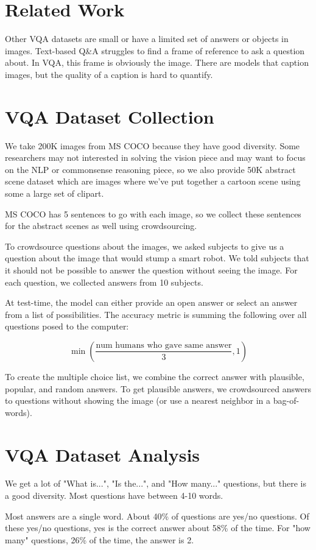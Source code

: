 \documentclass[a4paper]{article}
\begin{document}
\section{Related Work}
Other VQA datasets are small or have a limited set of answers or objects in
images. Text-based Q&A struggles to find a frame of reference to ask a question
about. In VQA, this frame is obviously the image. There are models that
caption images, but the quality of a caption is hard to quantify.

\section{VQA Dataset Collection}
We take 200K images from MS COCO because they have good diversity. Some
researchers may not interested in solving the vision piece and may want to
focus on the NLP or commonsense reasoning piece, so we also provide 50K
abstract scene dataset which are images where we've put together a cartoon scene
using some a large set of clipart.

MS COCO has 5 sentences to go with each image, so we collect these sentences
for the abstract scenes as well using crowdsourcing.

To crowdsource questions about the images, we asked subjects to give us a
question about the image that would stump a smart robot. We told subjects
that it should not be possible to answer the question without seeing the image.
For each question, we collected answers from 10 subjects.

At test-time, the model can either provide an open answer or select an answer
from a list of possibilities. The accuracy metric is summing the following
over all questions posed to the computer:

$$
\min(\frac{\textrm{num humans who gave same answer}}{3}, 1)
$$

To create the multiple choice list, we combine the correct answer with
plausible, popular, and random answers. To get plausible answers, we
crowdsourced answers to questions without showing the image (or use a
nearest neighbor in a bag-of-words).

\section{VQA Dataset Analysis}
We get a lot of "What is...", "Is the...", and "How many..." questions, but
there is a good diversity. Most questions have between 4-10 words.

Most answers are a single word. About 40\% of questions are yes/no questions.
Of these yes/no questions, yes is the correct answer about 58\% of the time.
For "how many" questions, 26\% of the time, the answer is 2.
\end{document}
